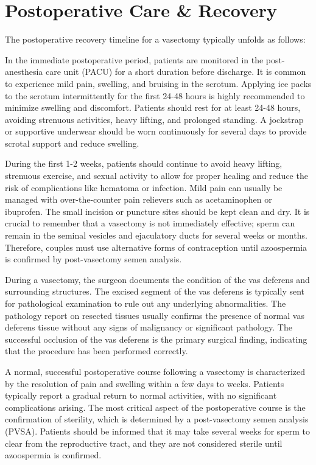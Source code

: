 \section*{Postoperative Care \& Recovery}
The postoperative recovery timeline for a vasectomy typically unfolds as follows:

In the immediate postoperative period, patients are monitored in the post-anesthesia care unit (PACU) for a short duration before discharge. It is common to experience mild pain, swelling, and bruising in the scrotum. Applying ice packs to the scrotum intermittently for the first 24-48 hours is highly recommended to minimize swelling and discomfort. Patients should rest for at least 24-48 hours, avoiding strenuous activities, heavy lifting, and prolonged standing. A jockstrap or supportive underwear should be worn continuously for several days to provide scrotal support and reduce swelling.

During the first 1-2 weeks, patients should continue to avoid heavy lifting, strenuous exercise, and sexual activity to allow for proper healing and reduce the risk of complications like hematoma or infection. Mild pain can usually be managed with over-the-counter pain relievers such as acetaminophen or ibuprofen. The small incision or puncture sites should be kept clean and dry. It is crucial to remember that a vasectomy is not immediately effective; sperm can remain in the seminal vesicles and ejaculatory ducts for several weeks or months. Therefore, couples must use alternative forms of contraception until azoospermia is confirmed by post-vasectomy semen analysis.

During a vasectomy, the surgeon documents the condition of the vas deferens and surrounding structures. The excised segment of the vas deferens is typically sent for pathological examination to rule out any underlying abnormalities. The pathology report on resected tissues usually confirms the presence of normal vas deferens tissue without any signs of malignancy or significant pathology. The successful occlusion of the vas deferens is the primary surgical finding, indicating that the procedure has been performed correctly.

A normal, successful postoperative course following a vasectomy is characterized by the resolution of pain and swelling within a few days to weeks. Patients typically report a gradual return to normal activities, with no significant complications arising. The most critical aspect of the postoperative course is the confirmation of sterility, which is determined by a post-vasectomy semen analysis (PVSA). Patients should be informed that it may take several weeks for sperm to clear from the reproductive tract, and they are not considered sterile until azoospermia is confirmed.

